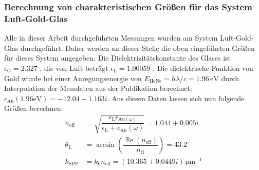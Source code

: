 \documentclass[titlepage,  ngerman]{article}
\renewcommand{\Re}{\operatorname{\mathbb{R}e}}
\begin{document}
	\subsubsection{Berechnung von charakteristischen Größen für das System Luft-Gold-Glas}
	Alle in dieser Arbeit durchgeführten Messungen wurden am System Luft-Gold-Glas durchgeführt. Daher werden an dieser Stelle die oben eingeführten Größen für dieses System angegeben. Die Dielektrizitätskonstante des Glases ist $\epsilon_{\mathrm{G}} = 2.327$ \cite{Zeiss.}, die von Luft beträgt $\epsilon_{\mathrm{L}} = 1.00059$ \cite{Hippel.1995}. Die dielektrische Funktion von Gold wurde bei einer Anregungsenergie von $E_{\mathrm{HeNe}} = h\lambda/c = 1.96\,\mathrm{eV} $ durch Interpolation der Messdaten aus der Publikation \cite{Olmon.2012} berechnet: $\epsilon_{\mathrm{Au}}(1.96\mathrm{eV}) = -12.04 +1.163i$. Aus diesen Daten lassen sich nun folgende Größen berechnen:
	\begin{subequations}
		\begin{align}
			n_{\mathrm{eff}} &= \sqrt{\dfrac{\epsilon_{\mathrm{L}}\epsilon_{\mathrm{Au}(\omega)}}{\epsilon_{\mathrm{L}} + 	\epsilon_{\mathrm{Au}}(\omega)}} = 	1.044 + 0.005i \label{eq:theo_n_eff}\\			
			\theta_\mathrm{L} &=  \arcsin\left(\dfrac{\Re(n_{\mathrm{eff}})}{ n_\mathrm{G}}\right) = 43.2^\circ 
			\label{eq:theo_theta_l}\\
			k_{\mathrm{SPP}} &= k_0 n_{\mathrm{eff}} = (10.365 + 0.0449i)\,\mathrm{\mu m}^{-1}\label{eq:theo_k_spp}
		\end{align}
	\end{subequations}
\end{document}
